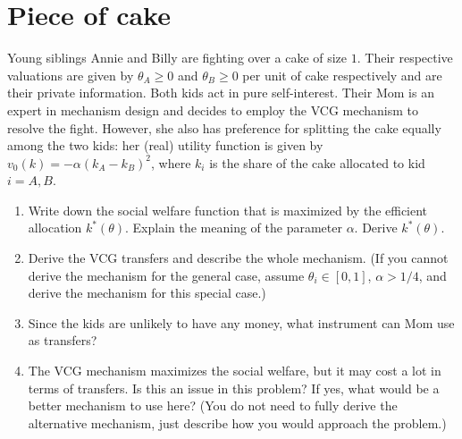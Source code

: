 \documentclass[a4paper]{article}
\newif\ifsolutions
\begin{document}
\section{Piece of cake}

	Young siblings Annie and Billy are fighting over a cake of size $1$. Their respective valuations are given by $\theta_A \geq 0$ and $\theta_B \geq 0$ per unit of cake respectively and are their private information. Both kids act in pure self-interest. Their Mom is an expert in mechanism design and decides to employ the VCG mechanism to resolve the fight. However, she also has preference for splitting the cake equally among the two kids: her (real) utility function is given by $v_0(k) = -\alpha(k_A - k_B)^2$, where $k_i$ is the share of the cake allocated to kid $i=A,B$.

	\begin{enumerate}
		\item Write down the social welfare function that is maximized by the efficient allocation $k^*(\theta)$. Explain the meaning of the parameter $\alpha$. Derive $k^*(\theta)$. 
		
		\item Derive the VCG transfers and describe the whole mechanism. (If you cannot derive the mechanism for the general case, assume $\theta_i \in [0,1]$, $\alpha > 1/4$, and derive the mechanism for this special case.)
		
		\item Since the kids are unlikely to have any money, what instrument can Mom use as transfers?
		
		\item The VCG mechanism maximizes the social welfare, but it may cost a lot in terms of transfers. Is this an issue in this problem? If yes, what would be a better mechanism to use here? (You do not need to fully derive the alternative mechanism, just describe how you would approach the problem.)
	\end{enumerate}



\ifsolutions
\end{document}
